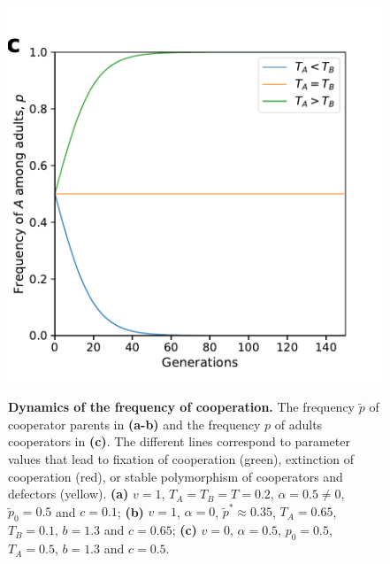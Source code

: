 \documentclass[12pt]{extarticle}
\begin{document}
\begin{figure}[p]
    ~\\
    \includegraphics[scale=0.45]{Time_Figure_No_Vertical.pdf}
  \caption{
  \textbf{Dynamics of the frequency of cooperation.}
  The frequency $\tilde{p}$ of cooperator parents in \textbf{(a-b)} and the frequency $p$ of adults cooperators in \textbf{(c)}.
  The different lines correspond to parameter values that lead to fixation of cooperation (green), extinction of cooperation (red), or stable polymorphism of cooperators and defectors (yellow).
  \textbf{(a)} $v=1$, $T_A=T_B=T = 0.2$, $\alpha = 0.5 \neq 0$, $\tilde{p}_0 = 0.5$ and $c=0.1$; \textbf{(b)} $v=1$, $\alpha = 0$, $\tilde{p}^* \approx 0.35$, $T_A = 0.65$, $T_B = 0.1$, $b=1.3$ and $c=0.65$; \textbf{(c)} $v=0$, $\alpha =0.5$, $p_0 = 0.5$, $T_A = 0.5$, $b=1.3$ and $c = 0.5$.
  }
  \label{fig:results}
\end{figure}



\end{document}
